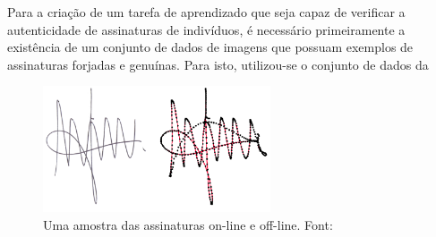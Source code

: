 Para a criação de um tarefa de aprendizado que seja capaz de verificar a autenticidade de assinaturas de indivíduos, é necessário primeiramente a existência de um conjunto de dados de imagens que possuam exemplos de assinaturas forjadas e genuínas. Para isto, utilizou-se o conjunto de dados da 

\begin{figure}[h!]
\centering
\caption{Uma amostra das assinaturas on-line e off-line. Font: \cite{icdar2009}}
\label{fig:sample-signature}
\includegraphics[width=0.6\textwidth]{imgs/sample-signature}
\end{figure}
